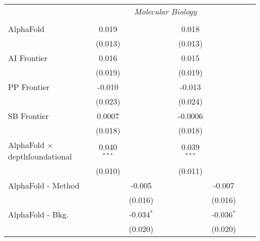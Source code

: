 \begin{tabular}{lcccccccc}
 & \multicolumn{6}{c}{\textit{Molecular Biology}} \\ \\
   AlphaFold                                      & 0.019         &               &       &       & 0.018         &               &       &   \\   
                                                  & (0.013)       &               &       &       & (0.013)       &               &       &   \\   
   AI Frontier                                    & 0.016         &               &       &       & 0.015         &               &       &   \\   
                                                  & (0.019)       &               &       &       & (0.019)       &               &       &   \\   
   PP Frontier                                    & -0.010        &               &       &       & -0.013        &               &       &   \\   
                                                  & (0.023)       &               &       &       & (0.024)       &               &       &   \\   
   SB Frontier                                    & 0.0007        &               &       &       & -0.0006       &               &       &   \\   
                                                  & (0.018)       &               &       &       & (0.018)       &               &       &   \\   
   AlphaFold $\times$ depthfoundational           & 0.040$^{***}$ &               &       &       & 0.039$^{***}$ &               &       &   \\   
                                                  & (0.010)       &               &       &       & (0.011)       &               &       &   \\   
   AlphaFold - Method                             &               & -0.005        &       &       &               & -0.007        &       &   \\   
                                                  &               & (0.016)       &       &       &               & (0.016)       &       &   \\   
   AlphaFold - Bkg.                               &               & -0.034$^{*}$  &       &       &               & -0.036$^{*}$  &       &   \\   
                                                  &               & (0.020)       &       &       &               & (0.020)       &       &   \\   

\end{tabular}
